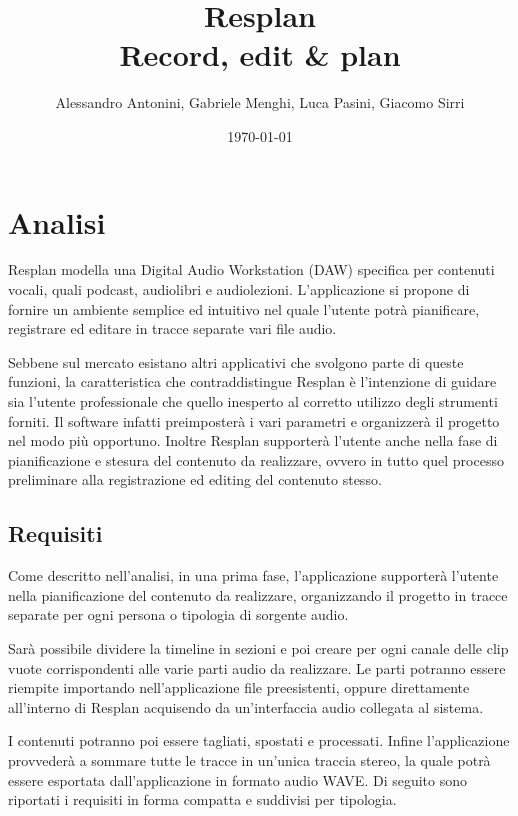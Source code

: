 \documentclass[a4paper,12pt]{report}
\title{Resplan \\ \large Record, edit \& plan}
\author{Alessandro Antonini, Gabriele Menghi, Luca Pasini, Giacomo Sirri}
\date{\today}
\begin{document}
\maketitle

\tableofcontents

\chapter{Analisi}

Resplan modella una Digital Audio Workstation (DAW) specifica per contenuti vocali, quali podcast, audiolibri e audiolezioni.
L’applicazione si propone di fornire un ambiente semplice ed intuitivo nel quale l’utente potrà pianificare, registrare ed editare in tracce separate vari file audio.

Sebbene sul mercato esistano altri applicativi che svolgono parte di queste funzioni, la caratteristica che contraddistingue Resplan è l’intenzione di guidare sia l’utente professionale che quello inesperto al corretto utilizzo degli strumenti forniti. Il software infatti preimposterà i vari parametri e organizzerà il progetto nel modo più opportuno. Inoltre Resplan supporterà l’utente anche nella fase di pianificazione e stesura del contenuto da realizzare, ovvero in tutto quel processo preliminare alla registrazione ed editing del contenuto stesso.


\section{Requisiti}

Come descritto nell’analisi, in una prima fase, l’applicazione supporterà l’utente nella pianificazione del contenuto da realizzare, organizzando il progetto in tracce separate per ogni persona o tipologia di sorgente audio.

Sarà possibile dividere la timeline in sezioni e poi creare per ogni canale delle clip vuote corrispondenti alle varie parti audio da realizzare.
Le parti potranno essere riempite importando nell’applicazione file preesistenti, oppure direttamente all’interno di Resplan acquisendo da un'interfaccia audio collegata al sistema.

I contenuti potranno poi essere tagliati, spostati e processati.
Infine l’applicazione provvederà a sommare tutte le tracce in un’unica traccia stereo, la quale potrà essere esportata dall’applicazione in formato audio WAVE.
Di seguito sono riportati i requisiti in forma compatta e suddivisi per tipologia.
\end{document}
